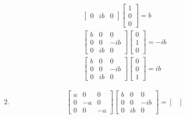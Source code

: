 \documentclass[12pt]{article}
\begin{document}
\begin{enumerate}
\begin{enumerate}
\begin{gather}
\begin{bmatrix}
                    0 & ib & 0
                \end{bmatrix}
                \begin{bmatrix}
                    1 \\
                    0 \\
                    0
                \end{bmatrix}=b\\
                \begin{bmatrix}
                    b & 0  & 0   \\
                    0 & 0  & -ib \\
                    0 & ib & 0
                \end{bmatrix}
                \begin{bmatrix}
                    0 \\
                    1 \\
                    0
                \end{bmatrix}=-ib\\
                \begin{bmatrix}
                    b & 0  & 0   \\
                    0 & 0  & -ib \\
                    0 & ib & 0
                \end{bmatrix}
                \begin{bmatrix}
                    0 \\
                    0 \\
                    1
                \end{bmatrix}=ib
            \end{gather}
            \item
            \begin{gather}
                \begin{bmatrix}
                    a & 0  & 0  \\
                    0 & -a & 0  \\
                    0 & 0  & -a
                \end{bmatrix}
                \begin{bmatrix}
                    b & 0  & 0   \\
                    0 & 0  & -ib \\
                    0 & ib & 0
                \end{bmatrix}=
                \begin{bmatrix}

\end{bmatrix}
\end{gather}
\end{enumerate}
\end{enumerate}
\end{document}
